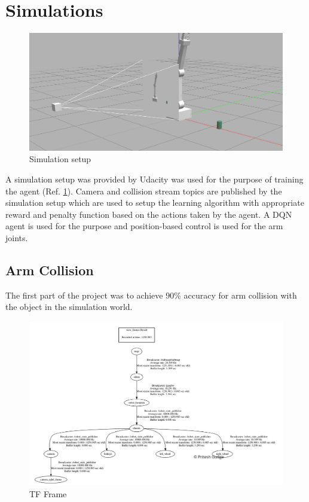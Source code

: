 \documentclass[10pt,journal,compsoc]{IEEEtran}
\begin{document}
\section{Simulations}

\begin{figure}[thpb]
      \centering
      \includegraphics[width=\linewidth]{images/4_training}
      \caption{Simulation setup}
      \label{fig:setup}
\end{figure}

A simulation setup was provided by Udacity was used for the purpose of training the agent (Ref. \ref{fig:setup}).
Camera and collision stream topics are published by the simulation setup which are used to setup the learning algorithm with appropriate reward and penalty function based on the actions taken by the agent. A DQN agent is used for the purpose and position-based control is used for the arm joints.


\subsection{Arm Collision}
The first part of the project was to achieve 90\% accuracy for arm collision with the object in the simulation world.

\begin{figure}[thpb]
      \centering
      \includegraphics[width=\linewidth]{images/tfframe}
      \caption{TF Frame}
      \label{fig:frame}
\end{figure}
\end{document}
